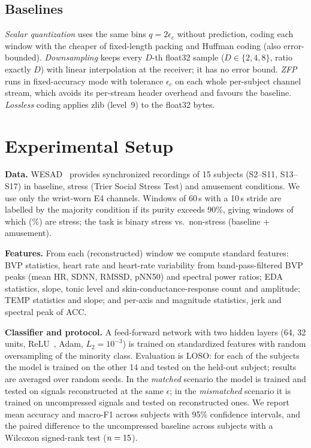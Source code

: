 \documentclass[conference]{IEEEtran}
\begin{document}
\subsection{Baselines}
\emph{Scalar quantization} uses the same bins $q=2\epsilon_c$ without prediction, coding each window with the cheaper of fixed-length packing and Huffman coding (also error-bounded). \emph{Downsampling} keeps every $D$-th float32 sample ($D\in\{2,4,8\}$, ratio exactly $D$) with linear interpolation at the receiver; it has no error bound. \emph{ZFP}~\cite{lindstrom2014} runs in fixed-accuracy mode with tolerance $\epsilon_c$ on each whole per-subject channel stream, which avoids its per-stream header overhead and favours the baseline. \emph{Lossless} coding applies zlib (level~9) to the float32 bytes.

\section{Experimental Setup}
\textbf{Data.} WESAD~\cite{schmidt2018} provides synchronized recordings of 15 subjects (S2--S11, S13--S17) in baseline, stress (Trier Social Stress Test) and amusement conditions. We use only the wrist-worn E4 channels. Windows of 60\,s with a 10\,s stride are labelled by the majority condition if its purity exceeds 90\%, giving \nWindows{} windows of which \nStressWindows{} (\pctStress\%) are stress; the task is binary stress vs.\ non-stress (baseline + amusement).

\textbf{Features.} From each (reconstructed) window we compute \nFeatures{} standard features: BVP statistics, heart rate and heart-rate variability from band-pass-filtered BVP peaks (mean HR, SDNN, RMSSD, pNN50) and spectral power ratios; EDA statistics, slope, tonic level and skin-conductance-response count and amplitude; TEMP statistics and slope; and per-axis and magnitude statistics, jerk and spectral peak of ACC.

\textbf{Classifier and protocol.} A feed-forward network with two hidden layers (64, 32 units, ReLU~\cite{he2015}, Adam, $L_2=10^{-3}$) is trained on standardized features with random oversampling of the minority class. Evaluation is LOSO: for each of the \nSubjects{} subjects the model is trained on the other 14 and tested on the held-out subject; results are averaged over \nSeeds{} random seeds. In the \emph{matched} scenario the model is trained and tested on signals reconstructed at the same $\epsilon$; in the \emph{mismatched} scenario it is trained on uncompressed signals and tested on reconstructed ones. We report mean accuracy and macro-F1 across subjects with 95\% confidence intervals, and the paired difference to the uncompressed baseline across subjects with a Wilcoxon signed-rank test ($n=15$).
\end{document}
